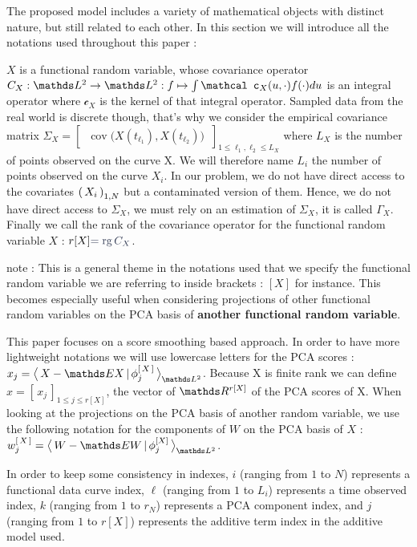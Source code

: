 The proposed model includes a variety of mathematical objects with distinct nature, but still related to each other. In this section we will introduce all the notations used throughout this paper :

\smallskip

$X$ is a functional random variable, whose covariance operator $C_X : \inlinefunc {\mathds L^2} {\mathds L^2} {f} {\int \mathcal c_X(u, \cdot) f(\cdot) du}$ is an integral operator where $\mathcal c_X$ is the kernel of that integral operator. Sampled data from the real world is discrete though, that's why we consider the empirical covariance matrix $\Sigma_X = \begin{bmatrix} \, \operatorname{cov}\bigl( X(t_{\ell_1}), X(t_{\ell_2}) \bigr) \, \end{bmatrix}_{1 \leq \ell_1, \ell_2 \leq L_X}$ where $L_X$ is the number of points observed on the curve X. We will therefore name $L_i$ the number of points observed on the curve $X_i$. In our problem, we do not have direct access to the covariates $\famfinie[i] X 1 N$ but a contaminated version of them. Hence, we do not have direct access to $\Sigma_X$, we must rely on an estimation of $\Sigma_X$, it is called $\Gamma_X$. Finally we call the rank of the covariance operator for the functional random variable $X$ : $r[X] \color{flatuicolors_biscay}{= \operatorname{rg} C_X}$.

\smallskip

note : This is a general theme in the notations used that we specify the functional random variable we are referring to inside brackets : $[X]$ for instance. This becomes especially useful when considering projections of other functional random variables on the PCA basis of \textbf{another functional random variable}.

\smallskip

This paper focuses on a score smoothing based approach. In order to have more lightweight notations we will use lowercase letters for the PCA scores : $x_j = \prodscalselon{X - \mathds EX}{\phi^{[\, X \,]}_j}{\mathds L^2}$. Because X is finite rank we can define $x = [ \, x_j \, ]_{1 \leq j \leq r[X]}$, the vector of $\R{r[X]}$ of the PCA scores of X. When looking at the projections on the PCA basis of another random variable, we use the following notation for the components of $W$ on the PCA basis of $X$ : $w^{[\, X \,]}_j = \prodscalselon{W - \mathds E W}{\phi_j^{[X]}}{\mathds L^2}$.

\smallskip

In order to keep some consistency in indexes, $i$ (ranging from $1$ to $N$) represents a functional data curve index, $\ell$ (ranging from $1$ to $L_i$) represents a time observed index, $k$ (ranging from $1$ to $r_N$) represents a PCA component index, and $j$ (ranging from $1$ to $r[X]$) represents the additive term index in the additive model used.

